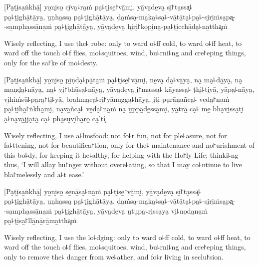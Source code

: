 
\begin{leader}
\end{leader}

[Pa̮ṭi̮sa̱ṅkhā̱] yo̱ni̮so̱ cī̱va̮꜕ra̱ṁ pa̮꜕ṭi̮se̱꜓vā̱mi̮, yā̱va̮de̱va̮ sī̱꜓ta̱ssa͓꜕\\
pa̮꜕ṭi̮ghā̱tā̱ya̮, u̱ṇha̱ssa̮ pa̮꜕ṭi̮ghā̱tā̱ya̮, ḍa̱ṁsa̮-ma̮ka̮꜕sa̮꜕-vā̱tā̱ta̮꜕pa̮꜕-si̮ri̱ṁsa̮pa͓-\\
-sa̱mpha̱ssā̱na̱ṁ pa̮꜕ṭi̮ghā̱tā̱ya̮, yā̱va̮de̱va̮ hi̮ri̮꜓ko̱pi̮na̮-pa̮꜕ṭi̱cchā̱da̮꜕na̱ttha͓ṁ

\begin{english}
  Wisely reflecting, I use the꜕ robe: only to ward o꜕ff cold, to ward o꜕ff heat, to ward off the touch o꜕f flies, mo꜕squitoes, wind, bu꜕rni꜕ng and cre꜓eping things, only for the sa꜓ke of mo꜕desty.
\end{english}

[Pa̮ṭi̮sa̱ṅkhā̱] yo̱ni̮so̱ pi̱ṇḍa̮꜕pā̱ta̱ṁ pa̮꜕ṭi̮se̱꜓vā̱mi̮, ne̱va̮ da̮꜕vā̱ya̮, na̮ ma̮꜕dā̱ya̮, na̮ ma̱ṇḍa̮꜕nā̱ya̮, na̮꜕ vi̮꜓bhū̱sa̮꜕nā̱ya̮, yā̱va̮de̱va̮ i̮꜓ma̱ssa̮꜕ kā̱ya̱ssa̮꜕ ṭhi̮꜕ti̮yā̱, yā̱pa̮꜕nā̱ya̮, vi̮hi̱ṁsū̱꜕pa̮ra̮꜓ti̮꜕yā̱, bra̱hma̮ca̮꜕ri̮꜓yā̱nu̱gga̮꜕hā̱ya̮, i̮ti̮ pu̮rā̱ṇa̱ñca̮꜕ ve̱da̮꜓na̱ṁ pa̮꜕ṭi̮ha̱꜓ṅkhā̱mi̮, na̮va̱ñca̮꜕ ve̱da̮꜓na̱ṁ na̮ u̱ppā̱de̱ssā̱mi̮, yā̱trā̱ ca̮꜕ me̱ bha̮vi̱ssa̮ti̮ a̮꜕na̮va̱jja̮tā̱ ca̮꜕ phā̱su̮vi̮hā̱ro̱ cā̱'ti͓

\begin{english}
  Wisely reflecting, I use a꜕lmsfood: not fo꜕r fun, not for ple꜕asure, not for fa꜕ttening, not for beautifica꜓tion, only for the꜕ maintenance and no꜓urishment of this bo꜕dy, for keeping it he꜕althy, for helping with the Ho꜓ly Life; thinki꜕ng thus, `I will allay hu꜓nger without overe꜕ating, so that I may co꜕ntinue to live bla꜓melessly and a꜕t ease.'
\end{english}

[Pa̮ṭi̮sa̱ṅkhā̱] yo̱ni̮so̱ se̱nā̱sa̮꜕na̱ṁ pa̮꜕ṭi̮se̱꜓vā̱mi̮, yā̱va̮de̱va̮ sī̱꜓ta̱ssa͓꜕\\
pa̮꜕ṭi̮ghā̱tā̱ya̮, u̱ṇha̱ssa̮ pa̮꜕ṭi̮ghā̱tā̱ya̮, ḍa̱ṁsa̮-ma̮ka̮꜕sa̮꜕-vā̱tā̱ta̮꜕pa̮꜕-si̮ri̱ṁsa̮pa͓-\\
-sa̱mpha̱ssā̱na̱ṁ pa̮꜕ṭi̮ghā̱tā̱ya̮, yā̱va̮de̱va̮ u̮tu̮pa̮꜕ri̱ssa̮ya̮ vi̮꜕no̱da̮na̱ṁ pa̮꜕ṭi̮sa̱꜓llā̱nā̱rā̱ma̱ttha͓ṁ

\begin{english}
  Wisely reflecting, I use the lo꜕dging: only to ward o꜕ff cold, to ward o꜕ff heat, to ward off the touch o꜕f flies, mo꜕squitoes, wind, bu꜕rni꜕ng and cre꜓eping things, only to remove the꜕ danger from we꜕ather, and fo꜕r living in seclu꜓sion.
\end{english}


